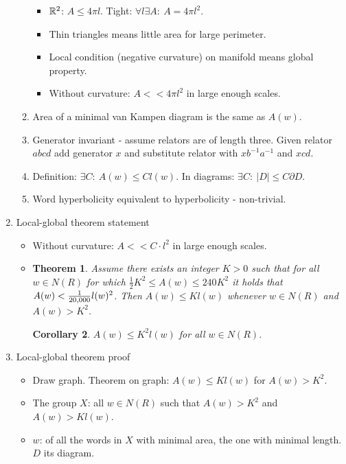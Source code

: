 \documentclass[11pt]{article} \usepackage{amssymb}
\newtheorem{theorem}{Theorem}[section]
\newtheorem{corollary}[theorem]{Corollary}
\newcommand{\half}{{\textstyle \frac12}}
\begin{document}
\begin{enumerate}
\begin{enumerate}
    \begin{itemize}
    \item $\mathbb R^2$: $A\leq 4\pi l$. Tight: $\forall l \exists A:\: A=4\pi l^2$.
    \item Thin triangles means little area for large perimeter.
    \item Local condition (negative curvature) on manifold means global 
      property.
    \item Without curvature: $A<<4\pi l^2$ in large enough scales.
    \end{itemize}
  \item Area of a minimal van Kampen diagram is the same as $A(w)$.
  \item Generator invariant - assume relators are of length three. Given
    relator $abcd$ add generator $x$ and substitute relator with $xb^{-1}a^{-1}$ and
    $xcd$.
  \item Definition: $\exists C:\: A(w)\leq Cl(w)$. In diagrams:
    $\exists C:\: |D|\leq C\partial D$.
  \item Word hyperbolicity equivalent to hyperbolicity - non-trivial.
  \end{enumerate}
  \item Local-global theorem statement
    \begin{itemize}
    \item Without curvature: $A<<C\cdot l^2$ in large enough scales.
    \item 
      \begin{theorem}
        Assume there exists an integer $K>0$ such that
        for all $w\in N(R)$ for which $\half K^2\leq A(w)\leq 240K^2$ it holds 
        that $A(w)<{1\over 20,000}l(w)^2$. Then $A(w)\leq Kl(w)$ whenever 
        $w\in N(R)$ and $A(w)>K^2$. 
      \end{theorem}
      \begin{corollary}
        $A(w)\leq K^2l(w)$ for all $w\in N(R)$.
      \end{corollary}
    \end{itemize}
  \item Local-global theorem proof
    \begin{itemize}
    \item Draw graph. Theorem on graph: $A(w)\leq Kl(w)$ for $A(w)>K^2$.
    \item The group $X$: all $w\in N(R)$ such that $A(w)>K^2$ and $A(w)>Kl(w)$.
    \item $w$: of all the words in $X$ with minimal area, the one with 
      minimal length. $D$ its diagram.

\end{itemize}
\end{enumerate}
\end{document}
